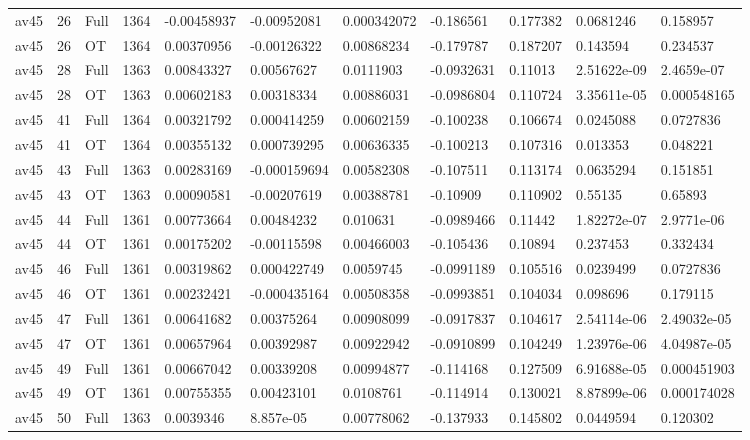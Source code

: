 \begin{landscape}
\begin{longtable}{lllllllllll}
av45 & 26 & Full & 1364 & -0.00458937 & -0.00952081 & 0.000342072 & -0.186561 & 0.177382 & 0.0681246 & 0.158957 \\
av45 & 26 & OT & 1364 & 0.00370956 & -0.00126322 & 0.00868234 & -0.179787 & 0.187207 & 0.143594 & 0.234537 \\
av45 & 28 & Full & 1363 & 0.00843327 & 0.00567627 & 0.0111903 & -0.0932631 & 0.11013 & 2.51622e-09 & 2.4659e-07 \\
av45 & 28 & OT & 1363 & 0.00602183 & 0.00318334 & 0.00886031 & -0.0986804 & 0.110724 & 3.35611e-05 & 0.000548165 \\
av45 & 41 & Full & 1364 & 0.00321792 & 0.000414259 & 0.00602159 & -0.100238 & 0.106674 & 0.0245088 & 0.0727836 \\
av45 & 41 & OT & 1364 & 0.00355132 & 0.000739295 & 0.00636335 & -0.100213 & 0.107316 & 0.013353 & 0.048221 \\
av45 & 43 & Full & 1363 & 0.00283169 & -0.000159694 & 0.00582308 & -0.107511 & 0.113174 & 0.0635294 & 0.151851 \\
av45 & 43 & OT & 1363 & 0.00090581 & -0.00207619 & 0.00388781 & -0.10909 & 0.110902 & 0.55135 & 0.65893 \\
av45 & 44 & Full & 1361 & 0.00773664 & 0.00484232 & 0.010631 & -0.0989466 & 0.11442 & 1.82272e-07 & 2.9771e-06 \\
av45 & 44 & OT & 1361 & 0.00175202 & -0.00115598 & 0.00466003 & -0.105436 & 0.10894 & 0.237453 & 0.332434 \\
av45 & 46 & Full & 1361 & 0.00319862 & 0.000422749 & 0.0059745 & -0.0991189 & 0.105516 & 0.0239499 & 0.0727836 \\
av45 & 46 & OT & 1361 & 0.00232421 & -0.000435164 & 0.00508358 & -0.0993851 & 0.104034 & 0.098696 & 0.179115 \\
av45 & 47 & Full & 1361 & 0.00641682 & 0.00375264 & 0.00908099 & -0.0917837 & 0.104617 & 2.54114e-06 & 2.49032e-05 \\
av45 & 47 & OT & 1361 & 0.00657964 & 0.00392987 & 0.00922942 & -0.0910899 & 0.104249 & 1.23976e-06 & 4.04987e-05 \\
av45 & 49 & Full & 1361 & 0.00667042 & 0.00339208 & 0.00994877 & -0.114168 & 0.127509 & 6.91688e-05 & 0.000451903 \\
av45 & 49 & OT & 1361 & 0.00755355 & 0.00423101 & 0.0108761 & -0.114914 & 0.130021 & 8.87899e-06 & 0.000174028 \\
av45 & 50 & Full & 1363 & 0.0039346 & 8.857e-05 & 0.00778062 & -0.137933 & 0.145802 & 0.0449594 & 0.120302 \\

\end{longtable}
\end{landscape}
